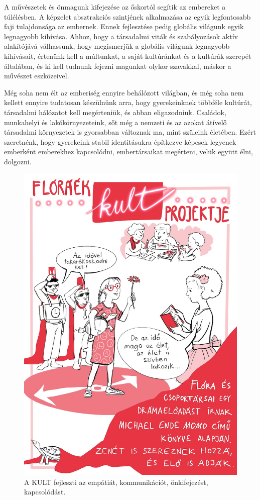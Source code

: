 A művészetek és önmagunk kifejezése az őskortól segítik az embereket a
túlélésben. A képzelet absztrakciós szintjének alkalmazása az egyik
legfontosabb faji tulajdonsága az embernek. Ennek fejlesztése pedig
globális világunk egyik legnagyobb kihívása. Ahhoz, hogy a társadalmi
viták és szabályozások aktív alakítójává válhassunk, hogy megismerjük a
globális világunk legnagyobb kihívásait, értenünk kell a múltunkat, a
saját kultúránkat és a kultúrák szerepét általában, és ki kell tudnunk
fejezni magunkat olykor szavakkal, máskor a művészet eszközeivel.

Még soha nem élt az emberiség ennyire behálózott világban, és még soha
nem kellett ennyire tudatosan készülnünk arra, hogy gyerekeinknek
többféle kultúrát, társadalmi hálózatot kell megérteniük, és abban
eligazodniuk. Családok, munkahelyi és lakókörnyezeteink, sőt még a
nemzeti és az azokat átívelő társadalmi környezetek is gyorsabban
változnak ma, mint szüleink életében. Ezért szeretnénk, hogy gyerekeink
stabil identitásukra építkezve képesek legyenek emberként emberekhez
kapcsolódni, embertársaikat megérteni, velük együtt élni, dolgozni.

\begin{figure}
\centering
\includegraphics{pics/2b_kult.jpg}
\caption{A KULT fejleszti az empátiát, kommunikációt, önkifejezést, kapcsolódást.}
\end{figure}

